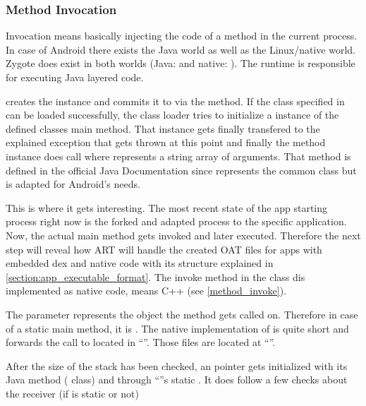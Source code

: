 \subsubsection{Method Invocation}\label{cl_loading}
Invocation means basically injecting the code of a method in the current process.
In case of Android there exists the Java world as well as the Linux/native world.
Zygote does exist in both worlds (Java: 
and native: ). The runtime is responsible for
executing Java layered code.

 creates the  instance and commits it to
 via the  method. If the class specified
in  can be loaded successfully, the class loader tries to initialize a
 instance of the defined classes main method.
That instance  gets finally transfered to the explained exception that gets thrown
at this point and finally the method instance  does call
 where  represents a string array of
arguments. That method is defined in the official Java Documentation \parencite{java_method} since
 represents the common  class but is adapted for Android's needs.

This is where it gets interesting. The most recent state of the app starting process
right now is the forked and adapted process to the specific application. Now, the actual main
method gets invoked and later executed. Therefore the next step will reveal how ART will handle the
created OAT files for apps with embedded dex and native code with its structure explained in \autoref{section:app_executable_format}. The invoke method in the  class dis implemented as native code, means C++ (see \autoref{method_invoke}).

The  parameter represents the object the method gets called on. Therefore
in case of a static main method, it is . The native implementation of 
is quite short and forwards the call to  located in
``''. Those files are located at ``''.


After the size of the stack has been checked, an  pointer gets initialized with
its Java method ( class) and through ``''s static . It does follow a few checks about the receiver (if  is static or
not)





